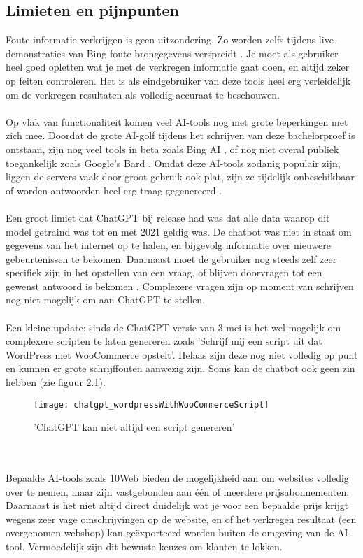 \subsection{Limieten en pijnpunten}
Foute informatie verkrijgen is geen uitzondering. Zo worden zelfs tijdens live-demonstraties van Bing foute brongegevens verspreidt \autocite{Bellens2023}. Je moet als gebruiker heel goed opletten wat je met de verkregen informatie gaat doen, en altijd zeker op feiten controleren. Het is als eindgebruiker van deze tools heel erg verleidelijk om de verkregen resultaten als volledig accuraat te beschouwen.
\\\\
Op vlak van functionaliteit komen veel AI-tools nog met grote beperkingen met zich mee. Doordat de grote AI-golf tijdens het schrijven van deze bachelorproef is ontstaan, zijn nog veel tools in beta zoals Bing AI \autocite{Dent2023}, of nog niet overal publiek toegankelijk zoals Google's Bard \autocite{Dawes2023}. Omdat deze AI-tools zodanig populair zijn, liggen de servers vaak door groot gebruik ook plat, zijn ze tijdelijk onbeschikbaar of worden antwoorden heel erg traag gegenereerd \autocite{Leong2023}. 
\\\\
Een groot limiet dat ChatGPT bij release had was dat alle data waarop dit model getraind was tot en met 2021 geldig was. De chatbot was niet in staat om gegevens van het internet op te halen, en bijgevolg informatie over nieuwere gebeurtenissen te bekomen. Daarnaast moet de gebruiker nog steeds zelf zeer specifiek zijn in het opstellen van een vraag, of blijven doorvragen tot een gewenst antwoord is bekomen \autocite{Tips2022}. Complexere vragen zijn op moment van schrijven nog niet mogelijk om aan ChatGPT te stellen.
\\\\
Een kleine update: sinds de ChatGPT versie van 3 mei is het wel mogelijk om complexere scripten te laten genereren zoals 'Schrijf mij een script uit dat WordPress met WooCommerce opstelt'. Helaas zijn deze nog niet volledig op punt en kunnen er grote schrijffouten aanwezig zijn. Soms kan de chatbot ook geen zin hebben (zie figuur 2.1).
\begin{figure}
    \caption{'ChatGPT kan niet altijd een script genereren'}
    \begin{center}
        \texttt{[image: chatgpt\_wordpressWithWooCommerceScript]}
    \end{center}
\end{figure}
\\\\
Bepaalde AI-tools zoals 10Web bieden de mogelijkheid aan om websites volledig over te nemen, maar zijn vastgebonden aan één of meerdere prijsabonnementen. Daarnaast is het niet altijd direct duidelijk wat je voor een bepaalde prijs krijgt wegens zeer vage omschrijvingen op de website, en of het verkregen resultaat (een overgenomen webshop) kan geëxporteerd worden buiten de omgeving van de AI-tool. Vermoedelijk zijn dit bewuste keuzes om klanten te lokken.  

